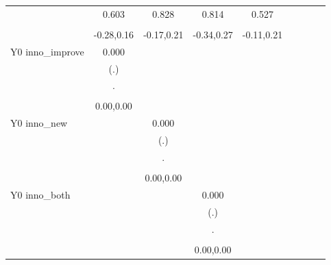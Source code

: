 \begin{table}[!h]
\begin{adjustbox}{width=\columnwidth,center}
\begin{tabular}{l*{8}{c}}
                    &       0.603         &       0.828         &       0.814         &       0.527         \\
                    &                     &                     &                     &                     \\
                    &  -0.28,0.16         &  -0.17,0.21         &  -0.34,0.27         &  -0.11,0.21         \\
Y0 inno\_improve     &       0.000         &                     &                     &                     \\
                    &         (.)         &                     &                     &                     \\
                    &           .         &                     &                     &                     \\
                    &                     &                     &                     &                     \\
                    &   0.00,0.00         &                     &                     &                     \\
Y0 inno\_new         &                     &       0.000         &                     &                     \\
                    &                     &         (.)         &                     &                     \\
                    &                     &           .         &                     &                     \\
                    &                     &                     &                     &                     \\
                    &                     &   0.00,0.00         &                     &                     \\
Y0 inno\_both        &                     &                     &       0.000         &                     \\
                    &                     &                     &         (.)         &                     \\
                    &                     &                     &           .         &                     \\
                    &                     &                     &                     &                     \\
                    &                     &                     &   0.00,0.00         &                     \\

\end{tabular}
\end{adjustbox}
\end{table}
